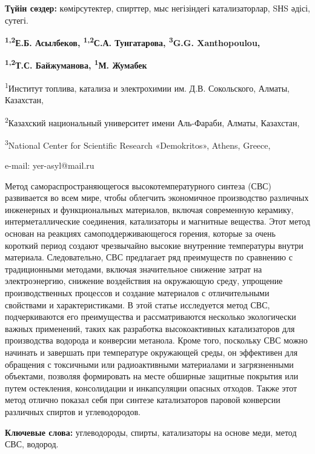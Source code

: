 {\bfseries Түйін сөздер:} көмірсутектер, спирттер, мыс негізіндегі
катализаторлар, SНS әдісі, сутегі.


\begin{center}
{\bfseries \textsuperscript{1,2}Е.Б. Асылбеков\envelope, \textsuperscript{1,2}С.А.
Тунгатарова, \textsuperscript{3}G.G. Xanthopoulou,}

{\bfseries \textsuperscript{1,2}Т.С. Байжуманова, \textsuperscript{1}М.
Жумабек}

\textsuperscript{1}Институт топлива, катализа и электрохимии им. Д.В.
Сокольского, Алматы, Казахстан,

\textsuperscript{2}Казахский национальный университет имени Аль-Фараби,
Алматы, Казахстан,

\textsuperscript{3}National Center for Scientific Research «Demokritos»,
Athens, Greece,

e-mail: yer-asyl@mail.ru
\end{center}

Метод самораспространяющегося высокотемпературного синтеза (СВС)
развивается во всем мире, чтобы облегчить экономичное производство
различных инженерных и функциональных материалов, включая современную
керамику, интерметаллические соединения, катализаторы и магнитные
вещества. Этот метод основан на реакциях самоподдерживающегося горения,
которые за очень короткий период создают чрезвычайно высокие внутренние
температуры внутри материала. Следовательно, СВС предлагает ряд
преимуществ по сравнению с традиционными методами, включая значительное
снижение затрат на электроэнергию, снижение воздействия на окружающую
среду, упрощение производственных процессов и создание материалов с
отличительными свойствами и характеристиками. В этой статье исследуется
метод СВС, подчеркиваются его преимущества и рассматриваются несколько
экологически важных применений, таких как разработка высокоактивных
катализаторов для производства водорода и конверсии метанола. Кроме
того, поскольку СВС можно начинать и завершать при температуре
окружающей среды, он эффективен для обращения с токсичными или
радиоактивными материалами и загрязненными объектами, позволяя
формировать на месте обширные защитные покрытия или путем остекления,
консолидации и инкапсуляции опасных отходов. Также этот метод отлично
показал себя при синтезе катализаторов паровой конверсии различных
спиртов и углеводородов.

{\bfseries Ключевые слова:} углеводороды, спирты, катализаторы на основе
меди, метод СВС, водород.

